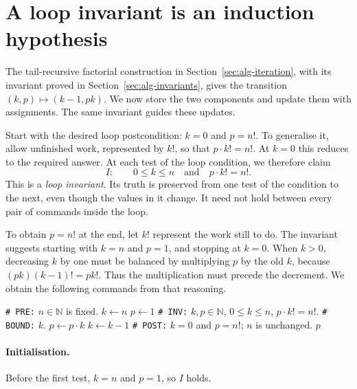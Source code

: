 \section{A loop invariant is an induction hypothesis}
\label{sec:imperative-invariants}

The tail-recursive factorial construction in Section~\ref{sec:alg-iteration}, with its invariant proved in Section~\ref{sec:alg-invariants}, gives the transition
$(k,p)\mapsto(k-1,pk)$. We now store the two components and update them
with assignments. The same invariant guides these updates.

Start with the desired loop postcondition: $k=0$ and $p=n!$.
To generalise it, allow unfinished work, represented by $k!$, so that
$p\cdot k!=n!$. At $k=0$ this reduces to the required answer.
At each test of the loop condition, we therefore claim
\[
I:\qquad 0\leq k\leq n\quad\text{and}\quad p\cdot k!=n!.
\]
This is a \emph{loop invariant}. Its truth is preserved from one test of
the condition to the next, even though the values in it change.
It need not hold between every pair of commands inside the loop.


To obtain $p=n!$ at the end, let $k!$ represent the work still to do.
The invariant suggests starting with $k=n$ and $p=1$, and stopping at
$k=0$. When $k>0$, decreasing $k$ by one must be balanced by multiplying
$p$ by the old $k$, because $(pk)(k-1)!=pk!$. Thus the multiplication must
precede the decrement. We obtain the following commands from that reasoning.

\begin{algorithm}[H]
\begin{algorithmic}[1]
\Statex \texttt{\# PRE:} $n\in\mathbb N$ is fixed.
\State $k\leftarrow n$
\State $p\leftarrow1$
\Statex \texttt{\# INV:} $k,p\in\mathbb N$, $0\leq k\leq n$, $p\cdot k!=n!$.
\Statex \texttt{\# BOUND:} $k$.
\State $p\leftarrow p\cdot k$
\State $k\leftarrow k-1$
\EndWhile
\Statex \texttt{\# POST:} $k=0$ and $p=n!$; $n$ is unchanged.
\State \Return $p$
\EndProcedure
\end{algorithmic}
\caption{Factorial by successive changes of state.}
\end{algorithm}

\paragraph{Initialisation.}
Before the first test, $k=n$ and $p=1$, so $I$ holds.

